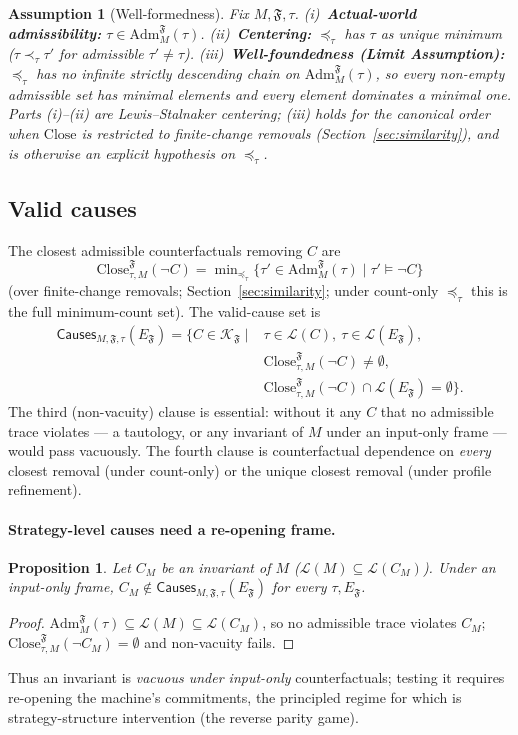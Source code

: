 \documentclass[11pt]{article}
\newtheorem{proposition}{Proposition}
\newtheorem{assumption}{Assumption}
\theoremstyle{remark}
\newcommand{\Close}{\mathrm{Close}}
\newcommand{\Lang}{\mathcal{L}}
\newcommand{\Frame}{\mathfrak{F}}
\newcommand{\Adm}{\mathrm{Adm}}
\begin{document}
\begin{assumption}[Well-formedness]
\label{ass:wf}
Fix \(M,\Frame,\tau\). (i)~\textbf{Actual-world admissibility:}
\(\tau\in\Adm_M^{\Frame}(\tau)\). (ii)~\textbf{Centering:} \(\preceq_\tau\) has
\(\tau\) as unique minimum (\(\tau\prec_\tau\tau'\) for admissible
\(\tau'\neq\tau\)). (iii)~\textbf{Well-foundedness (Limit Assumption):}
\(\preceq_\tau\) has no infinite strictly descending chain on
\(\Adm_M^{\Frame}(\tau)\), so every non-empty admissible set has minimal elements
and every element dominates a minimal one. Parts (i)--(ii) are Lewis--Stalnaker
centering; (iii) holds for the canonical order when \(\Close\) is restricted to
finite-change removals (Section~\ref{sec:similarity}), and is otherwise an explicit
hypothesis on \(\preceq_\tau\).
\end{assumption}

\subsection{Valid causes}

The closest admissible counterfactuals removing \(C\) are
\[
  \Close_{\tau,M}^{\Frame}(\neg C)=
  \min\nolimits_{\preceq_\tau}\{\tau'\in\Adm_M^{\Frame}(\tau)\mid\tau'\models\neg C\}
\]
(over finite-change removals; Section~\ref{sec:similarity}; under count-only
\(\preceq_\tau\) this is the full minimum-count set). The valid-cause set is
\[
\begin{aligned}
  \mathsf{Causes}_{M,\Frame,\tau}(E_{\Frame})=\{C\in\mathcal{K}_{\Frame}\mid{}&
  \tau\in\Lang(C),\ \tau\in\Lang(E_{\Frame}),\\
  &\Close_{\tau,M}^{\Frame}(\neg C)\neq\emptyset,\\
  &\Close_{\tau,M}^{\Frame}(\neg C)\cap\Lang(E_{\Frame})=\emptyset\}.
\end{aligned}
\]
The third (non-vacuity) clause is essential: without it any \(C\) that no
admissible trace violates --- a tautology, or any invariant of \(M\) under an
input-only frame --- would pass vacuously. The fourth clause is counterfactual
dependence on \emph{every} closest removal (under count-only) or the unique
closest removal (under profile refinement).

\paragraph{Strategy-level causes need a re-opening frame.}
\begin{proposition}
\label{prop:strategy-frame}
Let \(C_M\) be an invariant of \(M\) (\(\Lang(M)\subseteq\Lang(C_M)\)). Under an
input-only frame, \(C_M\notin\mathsf{Causes}_{M,\Frame,\tau}(E_{\Frame})\) for
every \(\tau,E_{\Frame}\).
\end{proposition}
\begin{proof}
\(\Adm_M^{\Frame}(\tau)\subseteq\Lang(M)\subseteq\Lang(C_M)\), so no admissible
trace violates \(C_M\); \(\Close_{\tau,M}^{\Frame}(\neg C_M)=\emptyset\) and
non-vacuity fails.
\end{proof}
Thus an invariant is \emph{vacuous under input-only} counterfactuals; testing it
requires re-opening the machine's commitments, the principled regime for which
is strategy-structure intervention (the reverse parity game).
\end{document}
